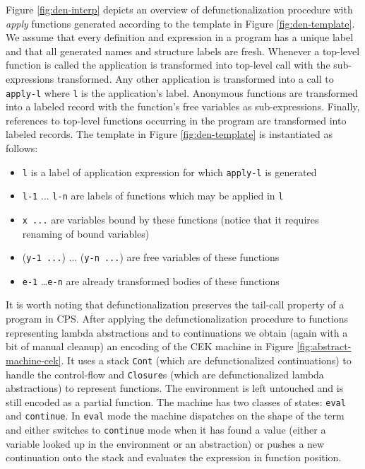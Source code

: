 Figure \ref{fig:den-interp} depicts an overview of defunctionalization procedure with \textit{apply} functions generated according to the template in Figure \ref{fig:den-template}.
We assume that every definition and expression in a program has a unique label and that all generated names and structure labels are fresh. 
Whenever a top-level function is called the application is transformed into top-level call with the sub-expressions transformed.
Any other application is transformed into a call to \texttt{apply-l} where \texttt{l} is the application's label.
Anonymous functions are transformed into a labeled record with the function's free variables as sub-expressions.
Finally, references to top-level functions occurring in the program are transformed into labeled records.
The template in Figure \ref{fig:den-template} is instantiated as follows:
\begin{itemize}
    \item \texttt{l} is a label of application expression for which \texttt{apply-l} is generated
    \item \texttt{l-1} $\ldots$ \texttt{l-n} are labels of functions which may be applied in \texttt{l}
    \item \texttt{x ...} are variables bound by these functions (notice that it requires renaming of bound variables)
    \item (\texttt{y-1 ...}) $\ldots$ (\texttt{y-n ...}) are free variables of these functions
    \item \texttt{e-1} \ldots \texttt{e-n} are already transformed bodies of these functions
\end{itemize}
It is worth noting that defunctionalization preserves the tail-call property of a program in CPS.
After applying the defunctionalization procedure to functions representing lambda abstractions and to continuations we obtain (again with a bit of manual cleanup) an encoding of the CEK machine \cite{Felleisen} in Figure \ref{fig:abstract-machine-cek}. 
It uses a stack \lstinline!Cont! (which are defunctionalized continuations) to handle the control-flow and \lstinline!Closure!s (which are defunctionalized lambda abstractions) to represent functions.
The environment is left untouched and is still encoded as a partial function.
The machine has two classes of states: \lstinline!eval! and \lstinline!continue!.
In \lstinline!eval! mode the machine dispatches on the shape of the term and either switches to \lstinline!continue! mode when it has found a value (either a variable looked up in the environment or an abstraction) or pushes a new continuation onto the stack and evaluates the expression in function position.
